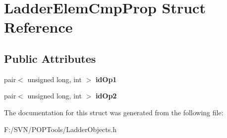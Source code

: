 \hypertarget{struct_ladder_elem_cmp_prop}{\section{Ladder\-Elem\-Cmp\-Prop Struct Reference}
\label{struct_ladder_elem_cmp_prop}
}
\subsection*{Public Attributes}
\begin{DoxyCompactItemize}
\item 
\hypertarget{struct_ladder_elem_cmp_prop_a1fa9d9b5ab714c275dd15b5f5a8167c6}{pair$<$ unsigned long, int $>$ {\bfseries id\-Op1}}\label{struct_ladder_elem_cmp_prop_a1fa9d9b5ab714c275dd15b5f5a8167c6}

\item 
\hypertarget{struct_ladder_elem_cmp_prop_a63a7929178421773f4451b3d75529473}{pair$<$ unsigned long, int $>$ {\bfseries id\-Op2}}\label{struct_ladder_elem_cmp_prop_a63a7929178421773f4451b3d75529473}

\end{DoxyCompactItemize}


The documentation for this struct was generated from the following file\-:\begin{DoxyCompactItemize}
\item 
F\-:/\-S\-V\-N/\-P\-O\-P\-Tools/Ladder\-Objects.\-h\end{DoxyCompactItemize}
